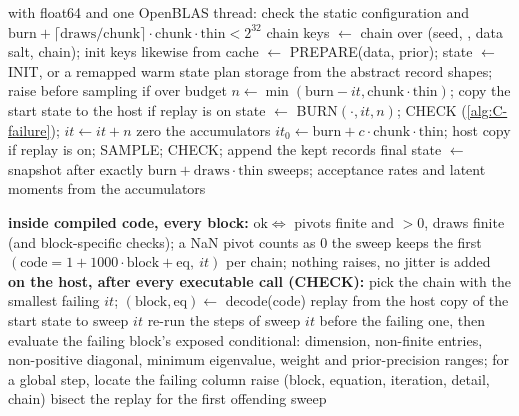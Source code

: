 \begin{algorithm}[!htbp]
\caption{Host driver ().}
\label{alg:C-driver}
\footnotesize
\begin{algorithmic}[1]
\State with float64 and one OpenBLAS thread: check the static configuration and $\mathrm{burn} + \lceil\mathrm{draws}/\mathrm{chunk}\rceil\cdot\mathrm{chunk}\cdot\mathrm{thin} < 2^{32}$
\State chain keys $\gets$  chain over (seed, , data salt, chain); init keys likewise from 
\State cache $\gets$ PREPARE(data, prior); state $\gets$ INIT, or a remapped warm state
\State plan storage from the abstract record shapes; raise  before sampling if over budget
  \State $n \gets \min(\mathrm{burn} - it, \mathrm{chunk}\cdot\mathrm{thin})$; copy the start state to the host if replay is on
  \State state $\gets$ BURN$(\cdot, it, n)$; CHECK (\cref{alg:C-failure}); $it \gets it + n$
\EndWhile
\State zero the accumulators
  \State $it_0 \gets \mathrm{burn} + c\cdot\mathrm{chunk}\cdot\mathrm{thin}$; host copy if replay is on; SAMPLE; CHECK; append the kept records
\EndFor
\State final state $\gets$ snapshot after exactly $\mathrm{burn} + \mathrm{draws}\cdot\mathrm{thin}$ sweeps; acceptance rates and latent moments from the accumulators
\end{algorithmic}
\end{algorithm}

\begin{algorithm}[!htbp]
\caption{Failures as values, and deterministic replay (, ;
).}
\label{alg:C-failure}
\footnotesize
\begin{algorithmic}[1]
\Statex \textbf{inside compiled code, every block:}
\State $\mathrm{ok} \Leftrightarrow$ pivots finite and $> 0$, draws finite (and block-specific checks); a NaN pivot counts as 0
\State the sweep keeps the first $(\mathrm{code} = 1 + 1000\cdot\mathrm{block} + \mathrm{eq},\ it)$ per chain; nothing raises, no jitter is added
\Statex \textbf{on the host, after every executable call (CHECK):}
  \State pick the chain with the smallest failing $it$; $(\mathrm{block}, \mathrm{eq}) \gets$ decode(code)
  \State replay from the host copy of the start state to sweep $it$ 
  \State re-run the steps of sweep $it$ before the failing one, then evaluate the failing block's exposed conditional: dimension, non-finite entries, non-positive diagonal, minimum eigenvalue, weight and prior-precision ranges; for a global step, locate the failing column
  \State raise (block, equation, iteration, detail, chain)
  \State bisect the replay for the first offending sweep
\EndIf
\end{algorithmic}
\end{algorithm}

